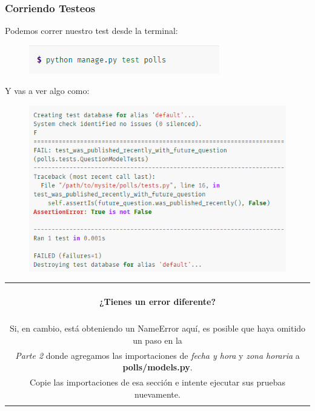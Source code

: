 \documentclass[10pt]{article}
\begin{document}
\subsubsection{Corriendo Testeos}
Podemos correr nuestro test desde la terminal:
\begin{figure}[H]
\begin{center}
\includegraphics[scale=1]{figuras/3/35/354/img1.png}
\end{center}
\end{figure}
Y vas a ver algo como:
\begin{figure}[H]
\begin{center}
\includegraphics[scale=0.9]{figuras/3/35/354/img2.png}
\end{center}
\end{figure}

\begin{table}[H]
	\begin{tabular}{||c||}
	\hline \\
	\begin{Large}
		\textbf{¿Tienes un error diferente?}
	\end{Large}
	\\\\		
Si, en cambio, está obteniendo un \textcolor{R}{NameError} aquí, es posible que haya omitido un paso en la\\ \textit{Parte 2} donde agregamos las importaciones de \textit{fecha y hora} y \textit{zona horaria} a \textbf{polls/models.py}.\\ Copie las importaciones de esa sección e intente ejecutar sus pruebas nuevamente.
	\\\\ \hline 	
	\end{tabular}			
\end{table}		
\end{document}
